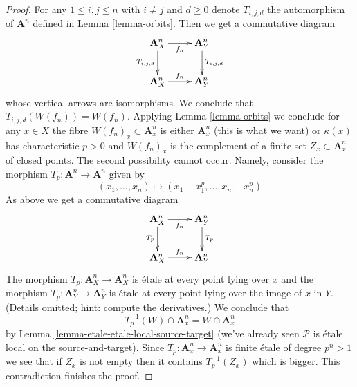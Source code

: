 \documentclass{stacks-project}
\theoremstyle{plain}
\theoremstyle{definition}
\theoremstyle{remark}
\numberwithin{equation}{subsection}
\begin{document}
\begin{proof}
\medskip\noindent
For any $1 \leq i, j \leq n$ with $i \not = j$ and $d \geq 0$
denote $T_{i, j, d}$ the automorphism of $\mathbf{A}^n$ defined
in Lemma \ref{lemma-orbits}. Then we get a commutative diagram
$$
\xymatrix{
\mathbf{A}^n_X \ar[r]_{f_n} \ar[d]_{T_{i, j, d}} &
\mathbf{A}^n_Y \ar[d]^{T_{i, j, d}} \\
\mathbf{A}^n_X \ar[r]^{f_n} & \mathbf{A}^n_Y
}
$$
whose vertical arrows are isomorphisms. We conclude that
$T_{i, j, d}(W(f_n)) = W(f_n)$. Applying Lemma \ref{lemma-orbits}
we conclude for any $x \in X$ the fibre $W(f_n)_x \subset \mathbf{A}^n_x$ is
either $\mathbf{A}^n_x$ (this is what we want) or $\kappa(x)$
has characteristic $p > 0$ and $W(f_n)_x$
is the complement of a finite set $Z_x \subset \mathbf{A}^n_x$
of closed points. The second possibility cannot occur. Namely,
consider the morphism $T_p : \mathbf{A}^n \to \mathbf{A}^n$ given by
$$
(x_1, \ldots, x_n) \mapsto (x_1 - x_1^p, \ldots, x_n - x_n^p)
$$
As above we get a commutative diagram
$$
\xymatrix{
\mathbf{A}^n_X \ar[r]_{f_n} \ar[d]_{T_p} &
\mathbf{A}^n_Y \ar[d]^{T_p} \\
\mathbf{A}^n_X \ar[r]^{f_n} & \mathbf{A}^n_Y
}
$$
The morphism $T_p : \mathbf{A}^n_X \to \mathbf{A}^n_X$
is \'etale at every point lying over $x$
and the morphism $T_p : \mathbf{A}^n_Y \to \mathbf{A}^n_Y$
is \'etale at every point lying over the image of $x$ in $Y$.
(Details omitted; hint: compute the derivatives.)
We conclude that
$$
T_p^{-1}(W) \cap \mathbf{A}^n_x = W \cap \mathbf{A}^n_x
$$
by Lemma \ref{lemma-etale-etale-local-source-target}
(we've already seen $\mathcal{P}$ is
\'etale local on the source-and-target).
Since $T_p : \mathbf{A}^n_x \to \mathbf{A}^n_x$ is finite \'etale
of degree $p^n > 1$ we see that if $Z_x$ is not empty then it contains
$T_p^{-1}(Z_x)$ which is bigger. This contradiction finishes
the proof.
\end{proof}
\end{document}
